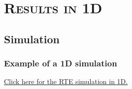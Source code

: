 



\section{\textsc{Results in 1D}}


\subsection{Simulation}


\begin{frame}[fragile]
  \frametitle{Example of a 1D simulation}

  \begin{center}
    \textcolor{violet}{\href{run:../img/Video1D.mp4}{Click here for the RTE simulation in 1D.}}
  \end{center}


\end{frame}

